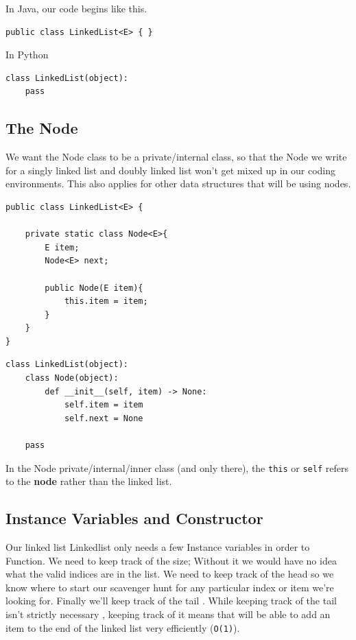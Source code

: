 \documentclass[10pt,a4paper]{book}
\begin{document}
In Java, our code begins like this.
\begin{verbatim}
public class LinkedList<E> { }
\end{verbatim}


In Python
\begin{verbatim}
class LinkedList(object):
	pass
\end{verbatim}


\subsection{The Node}
We want the Node class to be a private/internal class, so that the Node we write for a singly linked list and doubly linked list won't get mixed up in our coding environments.
This also applies for other data structures that will be using nodes.

\begin{verbatim}
public class LinkedList<E> { 
	
	private static class Node<E>{
		E item;
		Node<E> next;
		
		public Node(E item){
			this.item = item;
		}
	}
}
\end{verbatim}

\begin{verbatim}
class LinkedList(object):
	class Node(object):
		def __init__(self, item) -> None:
			self.item = item
			self.next = None

	pass
\end{verbatim}

In the Node private/internal/inner class (and only there), the \texttt{this} or \texttt{self} refers to the \textbf{node} rather than the linked list.





\subsection{Instance Variables and Constructor}

Our linked list Linkedlist only needs a few Instance  variables in order to Function. We need to keep track of the size; Without it we would have no idea what the valid indices are in the list. We need to keep track of the head so we know where to start our scavenger hunt for any particular index or item we're looking for.  Finally we'll keep track of the tail . While keeping track of the tail isn't strictly necessary , keeping track of it means that will be able to add an item to the end of the linked list very efficiently (\texttt{O(1)}).
\end{document}
